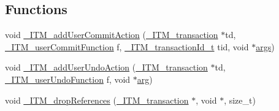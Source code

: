 \subsection*{Functions}
\begin{DoxyCompactItemize}
\item 
void \hyperlink{libitm-5_817_8cpp_a4971677078396b3f880c0933141fa518}{\-\_\-\-I\-T\-M\-\_\-add\-User\-Commit\-Action} (\hyperlink{libitm_8h_a65d3a93d285fdbde408558d6b431abc8}{\-\_\-\-I\-T\-M\-\_\-transaction} $\ast$td, \hyperlink{libitm_8h_ac19d9bbf121b4c401cbf3603a681aa0c}{\-\_\-\-I\-T\-M\-\_\-user\-Commit\-Function} f, \hyperlink{libitm_8h_a560abc8cf0e1499368b0cc014ee8bd60}{\-\_\-\-I\-T\-M\-\_\-transaction\-Id\-\_\-t} tid, void $\ast$\hyperlink{structargs}{args})
\item 
void \hyperlink{libitm-5_817_8cpp_a9d6acb4fa3abb483bfaeec8e387c9c32}{\-\_\-\-I\-T\-M\-\_\-add\-User\-Undo\-Action} (\hyperlink{libitm_8h_a65d3a93d285fdbde408558d6b431abc8}{\-\_\-\-I\-T\-M\-\_\-transaction} $\ast$td, \hyperlink{libitm_8h_ab839c16357d3c2a1b04f7a286bf476d1}{\-\_\-\-I\-T\-M\-\_\-user\-Undo\-Function} f, void $\ast$\hyperlink{structarg}{arg})
\item 
void \hyperlink{libitm-5_817_8cpp_a4947732b2f808f54398d7076c09ba303}{\-\_\-\-I\-T\-M\-\_\-drop\-References} (\hyperlink{libitm_8h_a65d3a93d285fdbde408558d6b431abc8}{\-\_\-\-I\-T\-M\-\_\-transaction} $\ast$, void $\ast$, size\-\_\-t)
\end{DoxyCompactItemize}


